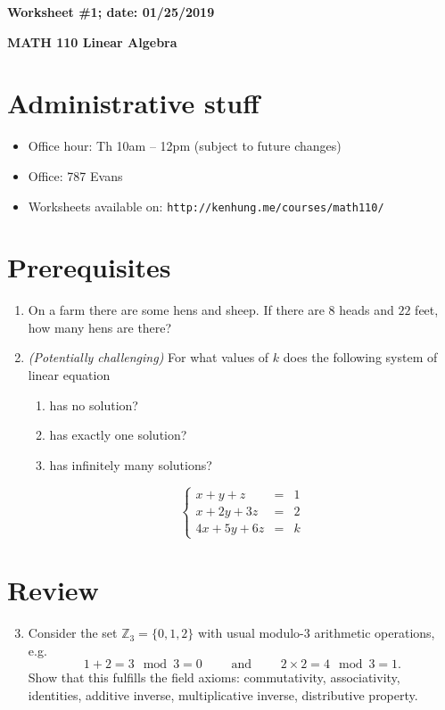 \documentclass{article}
\newcommand{\ZZ}{\mathbb{Z}}
\begin{document}
{\bf Worksheet \#1; date: 01/25/2019}

{\bf MATH 110 Linear Algebra}

\section{Administrative stuff}

\begin{itemize}
\item Office hour: Th 10am -- 12pm (subject to future changes)
\item Office: 787 Evans
\item Worksheets available on: {\tt http://kenhung.me/courses/math110/}
\end{itemize}

\section{Prerequisites}

\begin{enumerate}
\item On a farm there are some hens and sheep. If there are $8$ heads and $22$ feet, how many hens are there?

\item {\em (Potentially challenging)} For what values of $k$ does the following system of linear equation
\begin{enumerate}
\item has no solution?
\item has exactly one solution?
\item has infinitely many solutions?
\end{enumerate}
\[
	\left\{\begin{array}{rcl}
		x + y + z &=& 1 \\
		x + 2y + 3z &=& 2 \\
		4x + 5y + 6z &=& k
	\end{array}\right.
\]
\end{enumerate}

\section{Review}

\begin{enumerate}
\setcounter{enumi}{2}
\item Consider the set $\ZZ_3 = \{0, 1, 2\}$ with usual modulo-$3$ arithmetic operations, e.g.
\[
	1 + 2 = 3 \mod 3 = 0 \qquad \text{ and } \qquad 2 \times 2 = 4 \mod 3 = 1.
\]
Show that this fulfills the field axioms: commutativity, associativity, identities, additive inverse, multiplicative inverse, distributive property.
\end{enumerate}
\end{document}
